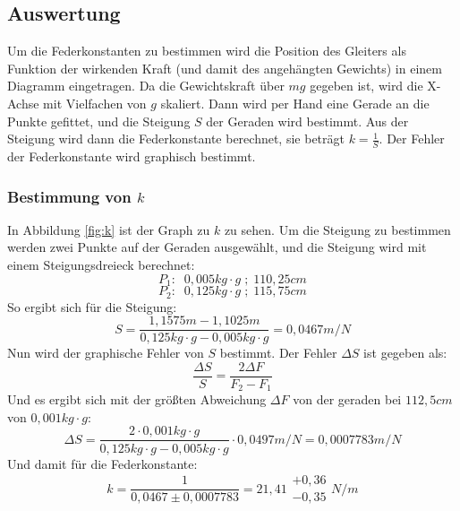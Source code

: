 \documentclass{article}
\begin{document}
      \subsection{Auswertung}
          Um die Federkonstanten zu bestimmen wird die Position des Gleiters als Funktion der wirkenden Kraft (und damit des angehängten Gewichts) in einem Diagramm eingetragen.
          Da die Gewichtskraft über $mg$ gegeben ist, wird die X-Achse mit Vielfachen von $g$ skaliert.
          Dann wird per Hand eine Gerade an die Punkte gefittet, und die Steigung $S$ der Geraden wird bestimmt.
          Aus der Steigung wird dann die Federkonstante berechnet, sie beträgt $k = \frac{1}{S}$. Der Fehler der Federkonstante wird graphisch bestimmt.

          \subsubsection{Bestimmung von $k$}
              In Abbildung \ref{fig:k} ist der Graph zu $k$ zu sehen.
              Um die Steigung zu bestimmen werden zwei Punkte auf der Geraden ausgewählt, und die Steigung wird mit einem Steigungsdreieck berechnet:\\
              \[P_1:\;\; 0,005kg\cdot g\; ;\; 110,25cm\]
              \[P_2:\;\; 0,125kg\cdot g\; ;\; 115,75cm\]
              So ergibt sich für die Steigung:
              \begin{equation}
                  S = \frac{1,1575m - 1,1025m}{0,125kg\cdot g - 0,005kg\cdot g} = 0,0467 m/N
              \end{equation}
              Nun wird der graphische Fehler von $S$ bestimmt.
              Der Fehler $\Delta S$ ist gegeben als:
              \begin{equation}
                  \frac{\Delta S}{S} = \frac{2\Delta F}{F_2 - F_1}
              \end{equation}
              Und es ergibt sich mit der größten Abweichung $\Delta F$ von der geraden bei $112,5cm$ von $0,001kg\cdot g$:
              \begin{equation}
                  \Delta S = \frac{2\cdot 0,001kg\cdot g}{0,125kg\cdot g - 0,005kg\cdot g}\cdot 0,0497m/N = 0,0007783m/N
              \end{equation}
              Und damit für die Federkonstante:
              \begin{equation}
                  k = \frac{1}{0,0467\pm 0,0007783} = 21,41\substack{+0,36 \\ -0,35}N/m
              \end{equation}
\end{document}
